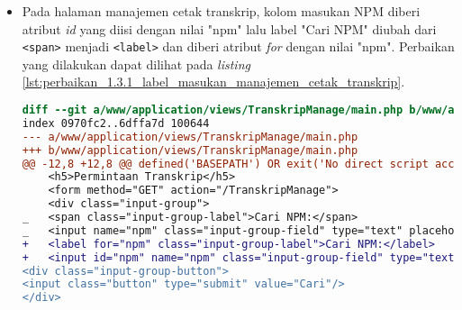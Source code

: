 \begin{itemize}
\item Pada halaman manajemen cetak transkrip, kolom masukan NPM diberi atribut \textit{id} yang diisi dengan nilai "npm" lalu label "Cari NPM" diubah dari \texttt{<span>} menjadi \texttt{<label>} dan diberi atribut \textit{for} dengan nilai "npm". Perbaikan yang dilakukan dapat dilihat pada \textit{listing} \ref{lst:perbaikan_1.3.1_label_masukan_manajemen_cetak_transkrip}.
\begin{lstlisting}[frame=single, label={lst:perbaikan_1.3.1_label_masukan_manajemen_cetak_transkrip}, language=diff, caption=Perbaikan Kriteria Sukses 1.3.1 pada Kolom Masukan di Halaman Manajemen Cetak Transkrip]
diff --git a/www/application/views/TranskripManage/main.php b/www/application/views/TranskripManage/main.php
index 0970fc2..6dffa7d 100644
--- a/www/application/views/TranskripManage/main.php
+++ b/www/application/views/TranskripManage/main.php
@@ -12,8 +12,8 @@ defined('BASEPATH') OR exit('No direct script access allowed');
    <h5>Permintaan Transkrip</h5>
    <form method="GET" action="/TranskripManage">
    <div class="input-group">
_   <span class="input-group-label">Cari NPM:</span>
_   <input name="npm" class="input-group-field" type="text" placeholder="2013730013" maxlength="10" minlength="10"<?= $npmQuery === NULL ? '' : " value='$npmQuery'" ?>/>
+   <label for="npm" class="input-group-label">Cari NPM:</label>
+   <input id="npm" name="npm" class="input-group-field" type="text" placeholder="2013730013" maxlength="10" minlength="10"<?= $npmQuery === NULL ? '' : " value='$npmQuery'" ?>/>
<div class="input-group-button">
<input class="button" type="submit" value="Cari"/>
</div>
\end{lstlisting}


\end{itemize}
